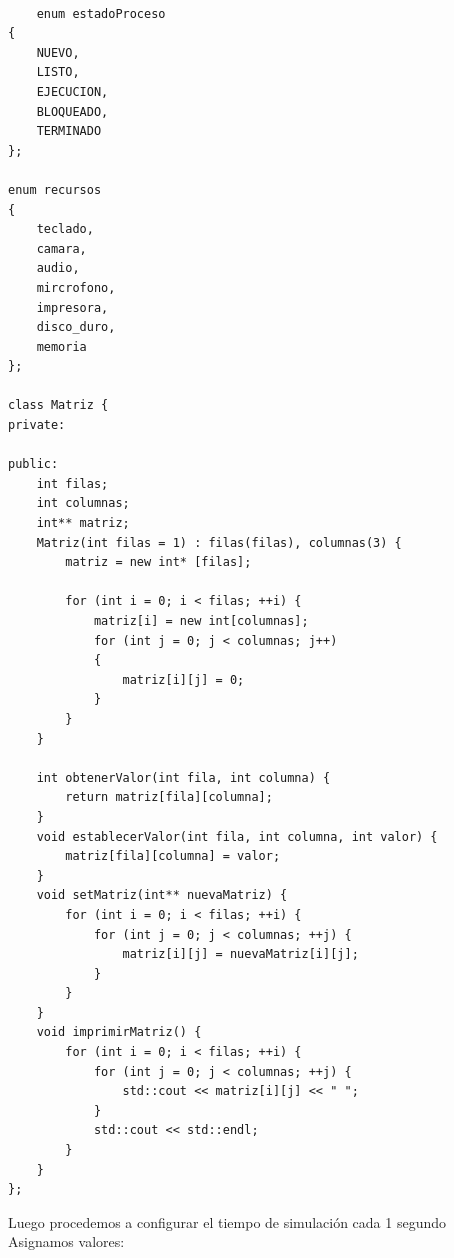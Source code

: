 \documentclass[12pt,a4paper]{article}
\begin{document}
\begin{lstlisting}
    
    enum estadoProceso
{
    NUEVO,
    LISTO,
    EJECUCION,
    BLOQUEADO,
    TERMINADO
};

enum recursos
{
    teclado,
    camara,
    audio,
    mircrofono,
    impresora,
    disco_duro,
    memoria
};

class Matriz {
private:
    
public:
    int filas;
    int columnas;  
    int** matriz;
    Matriz(int filas = 1) : filas(filas), columnas(3) {
        matriz = new int* [filas];

        for (int i = 0; i < filas; ++i) {
            matriz[i] = new int[columnas];
            for (int j = 0; j < columnas; j++)
            {
                matriz[i][j] = 0;
            }
        }
    }

    int obtenerValor(int fila, int columna) {
        return matriz[fila][columna];
    }
    void establecerValor(int fila, int columna, int valor) {
        matriz[fila][columna] = valor;
    }
    void setMatriz(int** nuevaMatriz) {
        for (int i = 0; i < filas; ++i) {
            for (int j = 0; j < columnas; ++j) {
                matriz[i][j] = nuevaMatriz[i][j];
            }
        }
    }
    void imprimirMatriz() {
        for (int i = 0; i < filas; ++i) {
            for (int j = 0; j < columnas; ++j) {
                std::cout << matriz[i][j] << " ";
            }
            std::cout << std::endl;
        }
    }
};

    \end{lstlisting}
Luego procedemos a configurar el tiempo de simulación  cada 1 segundo
Asignamos valores:
\end{document}
